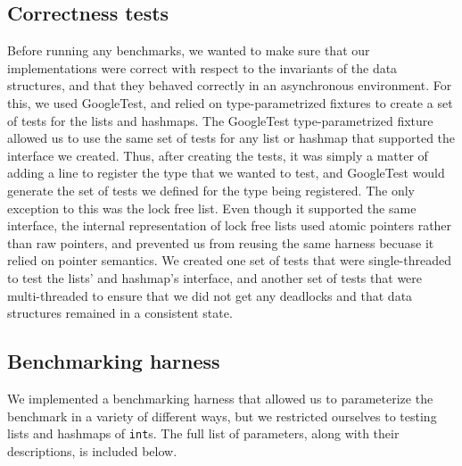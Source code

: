 \documentclass[11pt]{article}
\begin{document}
\subsection{Correctness tests}
Before running any benchmarks, we wanted to make sure that our implementations
were correct with respect to the invariants of the data structures, and that
they behaved correctly in an asynchronous environment. For this, we used
GoogleTest, and relied on type-parametrized fixtures to create a set of tests
for the lists and hashmaps. The GoogleTest type-parametrized fixture allowed us
to use the same set of tests for any list or hashmap that supported the
interface we created. Thus, after creating the tests, it was simply a matter of
adding a line to register the type that we wanted to test, and GoogleTest would
generate the set of tests we defined for the type being registered. The only
exception to this was the lock free list. Even though it supported the same
interface, the internal representation of lock free lists used atomic pointers
rather than raw pointers, and prevented us from reusing the same harness becuase
it relied on pointer semantics. We created one set of tests that were
single-threaded to test the lists' and hashmap's interface, and another set of
tests that were multi-threaded to ensure that we did not get any deadlocks and
that data structures remained in a consistent state.

\subsection{Benchmarking harness}
We implemented a benchmarking harness that allowed us to parameterize the
benchmark in a variety of different ways, but we restricted ourselves to testing
lists and hashmaps of {\tt int}s. The full list of parameters, along with their
descriptions, is included below.
\end{document}
